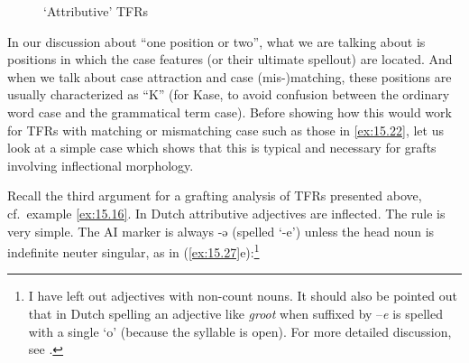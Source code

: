 \documentclass[output=paper]{langsci/langscibook}
\begin{document}
\begin{refcontext}
\begin{figure}
    \caption{\label{fig:ex:15.26}`Attributive' \glspl{TFR}}
\end{figure}

In our discussion about \enquote{one position or two}, what we are talking
about is positions  in which the case features (or their ultimate spellout) are
located.  And when we talk about case attraction and case (mis-)matching, these
positions are usually characterized as \enquote{K} (for Kase, to avoid
confusion between the ordinary word case and the grammatical term case). Before
showing how this would work for \glspl{TFR} with matching or mismatching case
such as those in \eqref{ex:15.22}, let us look at a simple case which shows
that this is typical and necessary for grafts involving inflectional
morphology.

Recall the third argument for a grafting analysis of \glspl{TFR} presented
above, cf.\ example \eqref{ex:15.16}. In Dutch attributive adjectives are inflected. The
rule is very simple. The \gls{AI} marker is always -ə
(spelled ‘-e’) unless the head noun is indefinite neuter singular, as in
(\ref{ex:15.27}e):\footnote{I have left out adjectives with non-count nouns. It should also
    be pointed out that in Dutch spelling an adjective like \emph{groot} when
    suffixed by –\emph{e}  is spelled with a single ‘o’ (because the syllable
is open). For more detailed discussion, see
\textcites[11--13]{Broekhuis2013a}.}


\end{refcontext}
\end{document}
